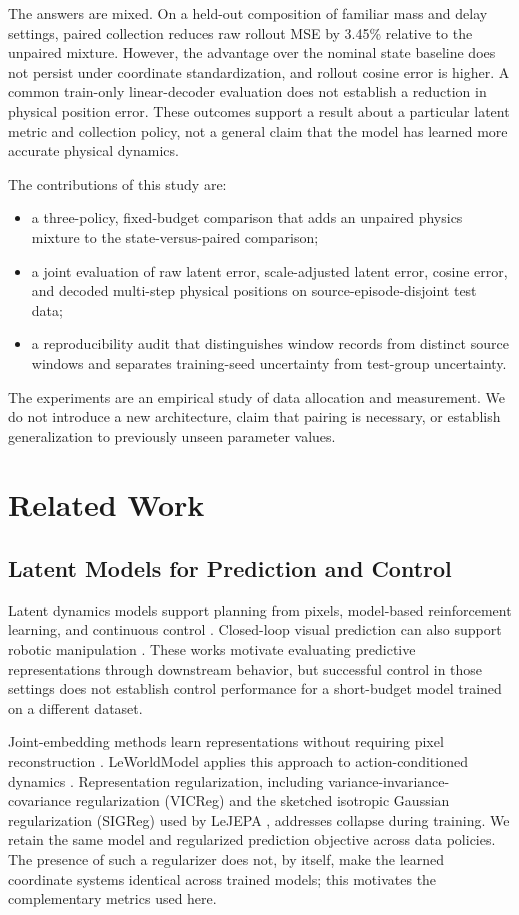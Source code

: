The answers are mixed. On a held-out composition of familiar mass and delay settings, paired collection reduces raw rollout MSE by 3.45\% relative to the unpaired mixture. However, the advantage over the nominal state baseline does not persist under coordinate standardization, and rollout cosine error is higher. A common train-only linear-decoder evaluation does not establish a reduction in physical position error. These outcomes support a result about a particular latent metric and collection policy, not a general claim that the model has learned more accurate physical dynamics.

The contributions of this study are:
\begin{itemize}
\item a three-policy, fixed-budget comparison that adds an unpaired physics mixture to the state-versus-paired comparison;
\item a joint evaluation of raw latent error, scale-adjusted latent error, cosine error, and decoded multi-step physical positions on source-episode-disjoint test data;
\item a reproducibility audit that distinguishes window records from distinct source windows and separates training-seed uncertainty from test-group uncertainty.
\end{itemize}
The experiments are an empirical study of data allocation and measurement. We do not introduce a new architecture, claim that pairing is necessary, or establish generalization to previously unseen parameter values.

\section{Related Work}
\subsection{Latent Models for Prediction and Control}
Latent dynamics models support planning from pixels, model-based reinforcement learning, and continuous control \cite{hafner2019planet,hafner2023mastering,hansen2024tdmpc2}. Closed-loop visual prediction can also support robotic manipulation \cite{ebert2018retrying}. These works motivate evaluating predictive representations through downstream behavior, but successful control in those settings does not establish control performance for a short-budget model trained on a different dataset.

Joint-embedding methods learn representations without requiring pixel reconstruction \cite{assran2023ijepa}. LeWorldModel applies this approach to action-conditioned dynamics \cite{maes2026leworldmodel}. Representation regularization, including variance-invariance-covariance regularization (VICReg) \cite{bardes2022vicreg} and the sketched isotropic Gaussian regularization (SIGReg) used by LeJEPA \cite{balestriero2025lejepa}, addresses collapse during training. We retain the same model and regularized prediction objective across data policies. The presence of such a regularizer does not, by itself, make the learned coordinate systems identical across trained models; this motivates the complementary metrics used here.

